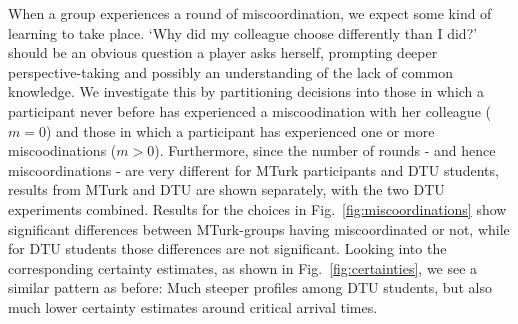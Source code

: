 \documentclass[a4paper,superscriptaddress,nofootinbib]{revtex4}
\begin{document}
When a group experiences a round of miscoordination, we expect some kind of learning to take place. `Why did my colleague choose differently than I did?' should be an obvious question a player asks herself, prompting deeper perspective-taking and possibly an understanding of the lack of common knowledge. We investigate this by partitioning decisions into those in which a participant never before has experienced a miscoodination with her colleague ($m=0$) and those in which a participant has experienced one or more miscoodinations ($m>0$). Furthermore, since the number of rounds - and hence miscoordinations - are very different for MTurk participants and DTU students, results from MTurk and DTU are shown separately, with the two DTU experiments combined. Results for the choices in Fig.~\ref{fig:miscoordinations} show significant differences between MTurk-groups having miscoordinated or not, while for DTU students those differences are not significant. Looking into the corresponding certainty estimates, as shown in Fig.~\ref{fig:certainties}, we see a similar pattern as before: Much steeper profiles among DTU students, but also much lower certainty estimates around critical arrival times. 

\end{document}
